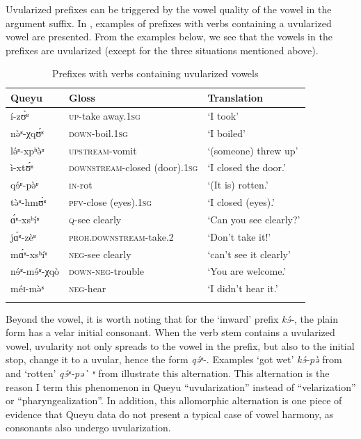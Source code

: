 \documentclass[output=paper]{langscibook}
\begin{document}
Uvularized prefixes can be triggered by the vowel quality of the vowel in the argument suffix. In , examples of prefixes with verbs containing a uvularized vowel are presented. From the examples below, we see that the vowels in the prefixes are uvularized (except for the three situations mentioned above).

\begin{table}
\caption{Prefixes with verbs containing uvularized vowels}
\label{tab:guan:7}
\begin{tabularx}{\textwidth}{Xll}
\lsptoprule
{Queyu} & {Gloss} & {Translation}\\
\midrule
{í-zʊ̀ʶ} & {\textsc{up}{}-take away.1\textsc{sg}} & {‘I took’} \\
{nə̀ʶ-χqʊ́ʶ} & {\textsc{down}{}-boil.1\textsc{sg}} & {‘I boiled’}\\
{lə́ʶ-xpʰə̀ʶ} & {\textsc{upstream}{}-vomit} & {‘(someone) threw up’}\\
{ì-xtʊ́ʶ} & {\textsc{downstream}{}-closed (door).1\textsc{sg}} & {‘I closed the door.’}\\
{qɘ́ʶ-pə̀ʶ} & {\textsc{in}{}-rot} & {‘(It is) rotten.’}\\
{tə̀ʶ-hmʊ́ʶ} & {\textsc{pfv}{}-close (eyes).1\textsc{sg}} & {‘I closed (eyes).’}\\
{ɑ́ʶ-xsʰíʶ} & {\textsc{q}{}-see clearly} & {‘Can you see clearly?’}\\
{jɑ́ʶ-zèʶ} & {\textsc{proh.downstream}{}-take.2} & {‘Don’t take it!’}\\
{mɑ́ʶ-xsʰíʶ} & {\textsc{neg}{}-see clearly} & {‘can’t see it clearly’}\\
{nɘ́ʶ-mɘ́ʶ-χqò} & {\textsc{down}{}-\textsc{neg}{}-trouble} & {‘You are welcome.’}\\
{méɪ-mə̀ʶ} & {\textsc{neg}{}-hear} & {‘I didn’t hear it.’}\\
\lspbottomrule
\end{tabularx}
\end{table}


Beyond the vowel, it is worth noting that for the ‘inward’ prefix \textit{kɘ́-}, the plain form has a velar initial consonant. When the verb stem contains a uvularized vowel, uvularity not only spreads to the vowel in the prefix, but also to the initial stop, change it to a uvular, hence the form \textit{qə́ʶ}{}-. Examples ‘got wet’ \textit{kɘ́-pə̀ {} } from  and ‘rotten’ \textit{qɘ́ʶ-pə\`{} ʶ} from  illustrate this alternation. This alternation is the reason I term this phenomenon in Queyu “uvularization” instead of “velarization” or “pharyngealization”. In addition, this allomorphic alternation is one piece of evidence that Queyu data do not present a typical case of vowel harmony, as consonants also undergo uvularization.
\end{document}
